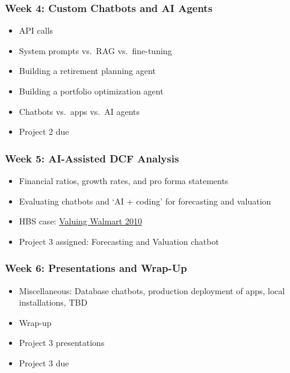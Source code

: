 \documentclass[11pt]{article}
\begin{document}
\subsubsection*{Week 4: Custom Chatbots and AI Agents}
\begin{itemize}\setlength{\itemsep}{0pt}
\item API calls
\item System prompts vs.\ RAG vs.\ fine-tuning
\item Building a retirement planning agent
\item Building a portfolio optimization agent
\item Chatbots vs.\ apps vs.\ AI agents
\item Project 2 due
\end{itemize}

\subsubsection*{Week 5: AI-Assisted DCF Analysis}
\begin{itemize}\setlength{\itemsep}{0pt}
\item Financial ratios, growth rates, and pro forma statements
\item Evaluating chatbots and `AI + coding' for forecasting and valuation
\item HBS case: \href{https://hbsp.harvard.edu/product/W11058-PDF-ENG}{Valuing Walmart 2010}
\item Project 3 assigned: Forecasting and Valuation chatbot
\end{itemize}

\subsubsection*{Week 6: Presentations and Wrap-Up}
\begin{itemize}\setlength{\itemsep}{0pt}
\item Miscellaneous: Database chatbots, production deployment of apps, local installations, TBD
\item Wrap-up
\item Project 3 presentations
\item Project 3 due
\end{itemize}
\end{document}
